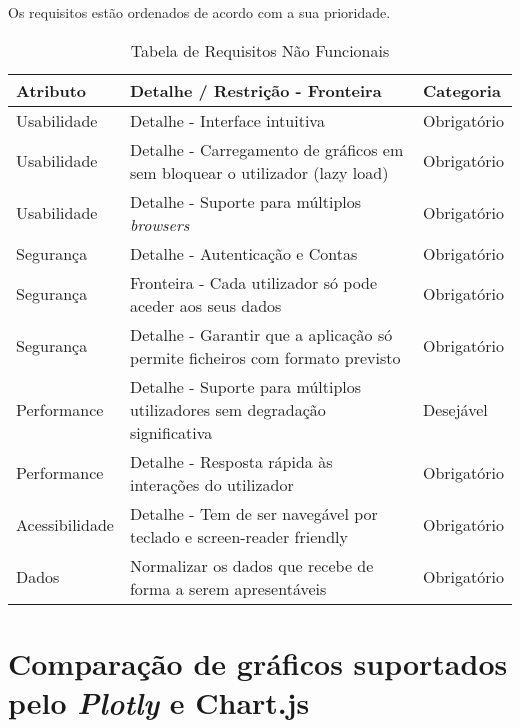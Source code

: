 Os requisitos estão ordenados de acordo com a sua prioridade.
\begin{table}[H]
    \centering
    \begin{tabular}{|l|p{7cm}|l|}
    \hline
    \textbf{Atributo} & \textbf{Detalhe / Restrição - Fronteira} & \textbf{Categoria} \\
    \hline
    Usabilidade & Detalhe - Interface intuitiva & Obrigatório \\
    Usabilidade & Detalhe - Carregamento de gráficos em sem bloquear o utilizador (lazy load) & Obrigatório \\
    Usabilidade & Detalhe - Suporte para múltiplos \textit{browsers} & Obrigatório \\
    Segurança & Detalhe - Autenticação e Contas & Obrigatório \\
    Segurança & Fronteira - Cada utilizador só pode aceder aos seus dados & Obrigatório \\
    Segurança & Detalhe - Garantir que a aplicação só permite ficheiros com formato previsto & Obrigatório \\
    Performance & Detalhe - Suporte para múltiplos utilizadores sem degradação significativa & Desejável \\
    Performance & Detalhe - Resposta rápida às interações do utilizador & Obrigatório \\
    Acessibilidade & Detalhe - Tem de ser navegável por teclado e screen-reader friendly & Obrigatório \\
    Dados & Normalizar os dados que recebe de forma a serem apresentáveis & Obrigatório \\

    \hline
    \end{tabular}
    \caption{Tabela de Requisitos Não Funcionais}
    \label{tab:requisitosNaofuncionais}
    \end{table}

\chapter{Comparação de gráficos suportados pelo \textit{Plotly} e Chart.js}
\label{ch:charts}

